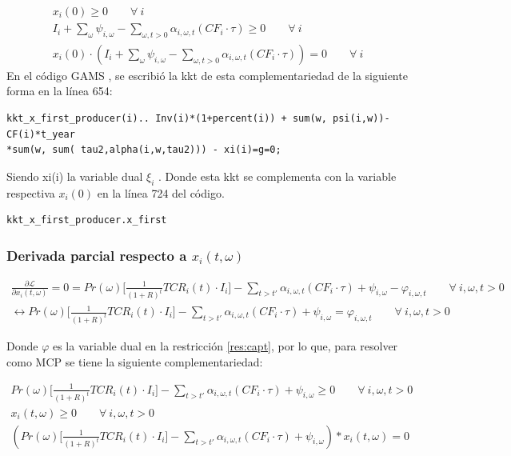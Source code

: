 \footnotesize{
\begin{align}
    x_i(0)\geq 0 \qquad \forall \  i \\
    I_i  + \sum_{\omega}\psi_{i,\omega} -\sum_{\omega, t>0} \alpha_{i,\omega,t}(CF_i\cdot \tau) \geq 0  \qquad \forall \  i\\
    x_i(0)\cdot(I_i  + \sum_{\omega}\psi_{i,\omega} -\sum_{\omega, t>0} \alpha_{i,\omega,t}(CF_i\cdot \tau))=0 \qquad \forall \  i
\end{align}
}
En el código GAMS , se escribió la kkt de esta complementariedad de la siguiente forma en la línea 654:
\begin{verbatim}
kkt_x_first_producer(i).. Inv(i)*(1+percent(i)) + sum(w, psi(i,w))- CF(i)*t_year
*sum(w, sum( tau2,alpha(i,w,tau2))) - xi(i)=g=0;
\end{verbatim}
Siendo xi(i) la variable dual $\xi_i$ . Donde esta kkt se complementa con la variable respectiva $x_i(0)$ en la línea 724 del código.
\begin{verbatim}
kkt_x_first_producer.x_first
\end{verbatim}

\subsubsection{Derivada parcial respecto a $x_i(t,\omega)$}
\footnotesize{
\begin{align}
    \frac{\partial \mathcal{L} }{\partial x_i(t,\omega)}= 0 = Pr(\omega) \Bigg[\frac{1}{(1+R)^t}TCR_i(t) \cdot I_i \Bigg] - \sum_{t> t\prime}\alpha_{i,\omega,t} ( CF_i \cdot \tau)+ \psi_{i,\omega}-\varphi_{i,\omega,t} \qquad  \forall \  i, \omega, t> 0\\
    \leftrightarrow Pr(\omega) \Bigg[\frac{1}{(1+R)^t}TCR_i(t) \cdot I_i \Bigg] - \sum_{t> t\prime}\alpha_{i,\omega,t} ( CF_i \cdot \tau)+ \psi_{i,\omega}=\varphi_{i,\omega,t} \qquad  \forall \  i, \omega, t> 0
\end{align}
}

Donde $\varphi$ es la variable dual en la restricción \ref{res:capt}, por lo que, para resolver como MCP se tiene la siguiente complementariedad:


\footnotesize{
\begin{align}
    Pr(\omega) \Bigg[\frac{1}{(1+R)^t}TCR_i(t) \cdot I_i \Bigg] - \sum_{t> t\prime}\alpha_{i,\omega,t} ( CF_i \cdot \tau)+ \psi_{i,\omega} \geq 0 \qquad  \forall \  i, \omega, t> 0\\
    x_i(t,\omega) \geq 0 \qquad  \forall \  i, \omega, t> 0\\
    (Pr(\omega) \Bigg[\frac{1}{(1+R)^t}TCR_i(t) \cdot I_i \Bigg] - \sum_{t> t\prime}\alpha_{i,\omega,t} ( CF_i \cdot \tau)+ \psi_{i,\omega})*x_i(t,\omega)=0
\end{align}
}

